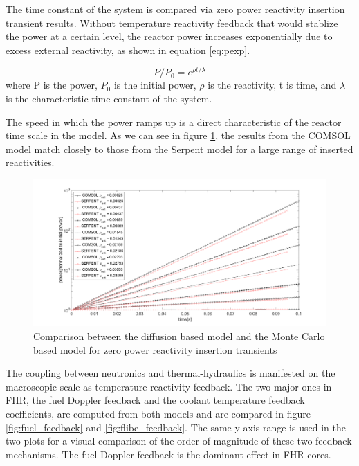 \documentclass{elsarticle}
\begin{document}
The time constant of the system is compared via zero power reactivity insertion transient results. Without temperature reactivity feedback that would stablize the power at a certain level, the reactor power increases exponentially due to excess external reactivity, as shown in equation \ref{eq:pexp}. 

\begin{equation}
P/P_0 =  e^{\rho t/\lambda}
\label{eq:pexp}
\end{equation}
where P is the power, $P_0$ is the initial power, $\rho$ is the reactivity, t is time, and $\lambda$ is the characteristic time constant of the system. 

The speed in which the power ramps up is a direct characteristic of the reactor time scale in the model. As we can see in figure \ref{fig:zero_power}, the results from the COMSOL model match closely to those from the Serpent model for a large range of inserted reactivities. 

\begin{figure}[ht]
  \centering
  \includegraphics[width=\columnwidth]{./images/benchmark/zero_power_transient.png}
  \caption{Comparison between the diffusion based model and the Monte Carlo based model for zero power reactivity insertion transients}
  \label{fig:zero_power}
\end{figure}


The coupling between neutronics and thermal-hydraulics is manifested on the macroscopic scale as temperature reactivity feedback. The two major ones in FHR, the fuel Doppler feedback and the coolant temperature feedback coefficients, are computed from both models and are compared in figure \ref{fig:fuel_feedback} and \ref{fig:flibe_feedback}. The same y-axis range is used in the two plots for a visual comparison of the order of magnitude of these two feedback mechanisms. The fuel Doppler feedback is the dominant effect in FHR cores. 
\end{document}
